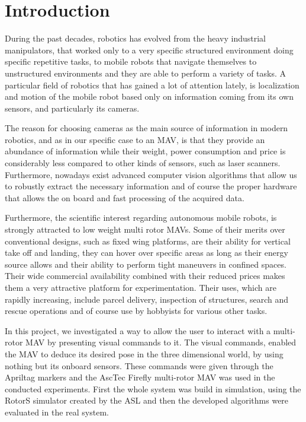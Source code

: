 \chapter{Introduction}
\label{sec:introduction}

During the past decades, robotics has evolved from the heavy industrial manipulators, that worked only to a very specific structured environment doing specific repetitive tasks, to mobile robots that navigate themselves to unstructured environments and they are able to perform a variety of tasks. A particular field of robotics that has gained a lot of attention lately, is localization and motion of the mobile robot based only on information coming from its own sensors, and particularly its cameras.

The reason for choosing cameras as the main source of information in modern robotics, and as in our specific case to an MAV, is that they provide an abundance of information while their weight, power consumption and price is considerably less compared to other kinds of sensors, such as laser scanners. Furthermore, nowadays exist advanced computer vision algorithms that allow us to robustly extract the necessary information and of course the proper hardware that allows the on board and fast processing of the acquired data.  

Furthermore, the scientific interest regarding autonomous mobile robots, is strongly attracted to low weight multi rotor MAVs. Some of their merits over conventional designs, such as fixed wing platforms, are their ability for vertical take off and landing, they can hover over specific areas as long as their energy source allows and their ability to perform tight maneuvers in confined spaces. Their wide commercial availability combined with their reduced prices makes them a very attractive platform for experimentation. Their uses, which are rapidly increasing, include parcel delivery, inspection of structures, search and rescue operations and of course use by hobbyists for various other tasks.     


In this project, we investigated a way to allow the user to interact with a multi-rotor MAV by presenting visual commands to it. The visual commands, enabled the MAV to deduce its desired pose in the three dimensional world, by using nothing but its onboard sensors. These commands were given through the Apriltag markers and the AscTec Firefly multi-rotor MAV was used in the conducted experiments. First the whole system was build in simulation, using the RotorS simulator created by the ASL \cite{RotorsSimulator} and then the developed algorithms were evaluated in the real system. 



